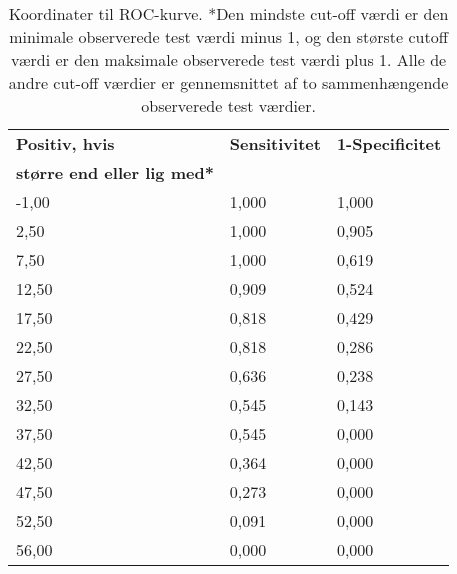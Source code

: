 \begin{table}[H]
\caption{Koordinater til ROC-kurve. *Den mindste cut-off værdi er den minimale observerede test værdi minus 1, og den største cutoff værdi er den maksimale observerede test værdi plus 1. Alle de andre cut-off værdier er gennemsnittet af to sammenhængende observerede test værdier.}
\vspace{2mm}
\label{table:app_ROC}
\centering
\begin{tabular}{p{3cm}|p{2.5cm}|p{2.5cm}}
\rowcolor[HTML]{C0C0C0}\textbf{Positiv, hvis} & \textbf{Sensitivitet} & \textbf{1-Specificitet} \\ 
\rowcolor[HTML]{C0C0C0} \textbf{større end eller lig med*} &  &    \\ \hline
-1,00 & 1,000 & 1,000 \\ \hline
2,50	& 1,000 & 0,905 \\ \hline
7,50 & 1,000 & 0,619 \\ \hline
12,50  & 0,909 & 0,524 \\ \hline
17,50 & 0,818 & 0,429 \\ \hline
22,50  & 0,818 & 0,286 \\ \hline
27,50  & 0,636 & 0,238 \\ \hline
32,50  & 0,545 & 0,143 \\ \hline
37,50  & 0,545 & 0,000 \\ \hline
42,50  & 0,364 & 0,000 \\ \hline
47,50 & 0,273 & 0,000 \\ \hline
52,50 & 0,091 & 0,000 \\ \hline
56,00 & 0,000 & 0,000  \\ \hline
\end{tabular}
\end{table}

